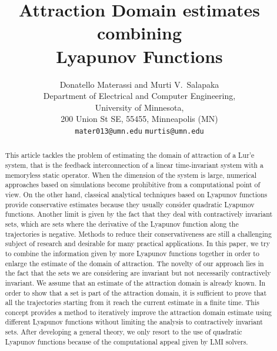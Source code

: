 \documentclass[letterpaper,10pt,twocolumn,journal,final]{IEEEtran}
\title{Attraction Domain estimates combining\\ Lyapunov Functions}
\author{
	Donatello Materassi\IEEEauthorrefmark{1} and
	Murti V.~Salapaka\IEEEauthorrefmark{7} \medskip\\
		Department of Electrical and Computer Engineering,\\
		University of Minnesota,\\
		200 Union St SE, 55455, Minneapolis (MN) \\
	\IEEEauthorrefmark{1}
		{\tt\small mater013@umn.edu} \medskip \qquad
	\IEEEauthorrefmark{7}
		{\tt\small murtis@umn.edu}
}
\begin{document}
\maketitle
\thispagestyle{empty}
\pagestyle{empty}

\begin{abstract}
This article tackles the problem of estimating the domain of attraction of a Lur'e system, that is the feedback interconnection of a linear time-invariant system with a memoryless static operator. When the dimension of the system is large, numerical approaches based on simulations become prohibitive from a computational point of view. On the other hand, classical analytical techniques based on Lyapunov functions provide conservative estimates because they usually consider quadratic Lyapunov functions. Another limit is given by the fact that they deal with contractively invariant sets, which are sets where the derivative of the Lyapunov function along the trajectories is negative.
Methods to reduce their conservativeness are still a challenging subject of research and desirable for many practical applications.
In this paper, we try to combine the information given by more Lyapunov functions together in order to enlarge the estimate of the domain of attraction. The novelty of our approach lies in the fact that the sets we are considering are invariant but not necessarily contractively invariant. We assume that an estimate of the attraction domain is already known. In order to show that a set is part of the attraction domain, it is sufficient to prove that all the trajectories starting from it reach the current estimate in a finite time.
This concept provides a method to iteratively improve the attraction domain estimate using different Lyapunov functions without limiting the analysis to contractively invariant sets.
After developing a general theory, we only resort to the use of quadratic Lyapunov functions because of the computational appeal given by LMI solvers.
\end{abstract}
\end{document}
